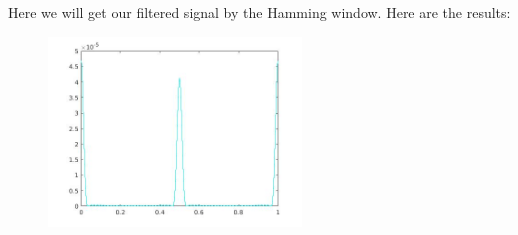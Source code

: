 \documentclass[a4paper,11pt]{article}
\begin{document}
Here we will get our filtered signal by the Hamming window. Here are the results:

\begin{figure}[!hp]
    \begin{center}
      \includegraphics[width=0.6\textwidth]{images/lab2_75.jpg}
    \end{center}
\end{figure}

\newpage
\end{document}
